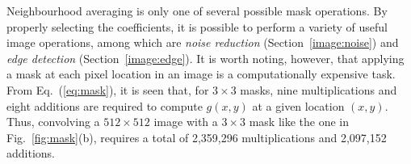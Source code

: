 Neighbourhood averaging is only one of several possible mask
operations.  By properly selecting the coefficients, it is possible to
perform a variety of useful image operations, among which are {\em
  noise reduction\/} (Section~\ref{image:noise}) and {\em edge
  detection\/} (Section~\ref{image:edge}).  It is worth noting,
however, that applying a mask at each pixel location in an image is a
computationally expensive task.  From Eq.~(\ref{eq:mask}), it is seen
that, for $3\times 3$ masks, nine multiplications and eight additions
are required to compute $g(x,y)$ at a given location $(x,y)$.  Thus,
convolving a $512\times 512$ image with a $3\times 3$ mask like the
one in Fig.~\ref{fig:mask}(b), requires a total of 2,359,296
multiplications and 2,097,152 additions.

